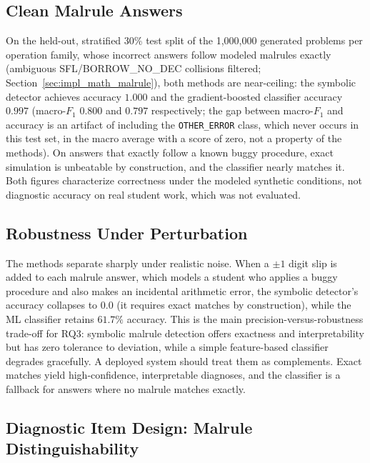 \subsection{Clean Malrule Answers}
\label{sec:eval_math_clean}

On the held-out, stratified 30\% test split of the 1{,}000{,}000 generated problems per operation family, whose incorrect answers follow modeled malrules exactly (ambiguous SFL/BORROW\_NO\_DEC collisions filtered; Section~\ref{sec:impl_math_malrule}), both methods are near-ceiling: the symbolic detector achieves accuracy $1.000$ and the gradient-boosted classifier accuracy $0.997$ (macro-$F_1$ $0.800$ and $0.797$ respectively; the gap between macro-$F_1$ and accuracy is an artifact of including the \texttt{OTHER\_ERROR} class, which never occurs in this test set, in the macro average with a score of zero, not a property of the methods). On answers that exactly follow a known buggy procedure, exact simulation is unbeatable by construction, and the classifier nearly matches it. Both figures characterize correctness under the modeled synthetic conditions, not diagnostic accuracy on real student work, which was not evaluated.

\subsection{Robustness Under Perturbation}
\label{sec:eval_math_noise}

The methods separate sharply under realistic noise. When a $\pm 1$ digit slip is added to each malrule answer, which models a student who applies a buggy procedure and also makes an incidental arithmetic error, the symbolic detector's accuracy collapses to $0.0$ (it requires exact matches by construction), while the ML classifier retains $61.7\%$ accuracy. This is the main precision-versus-robustness trade-off for RQ3: symbolic malrule detection offers exactness and interpretability but has zero tolerance to deviation, while a simple feature-based classifier degrades gracefully. A deployed system should treat them as complements. Exact matches yield high-confidence, interpretable diagnoses, and the classifier is a fallback for answers where no malrule matches exactly.

\subsection{Diagnostic Item Design: Malrule Distinguishability}
\label{sec:eval_math_distinguish}

